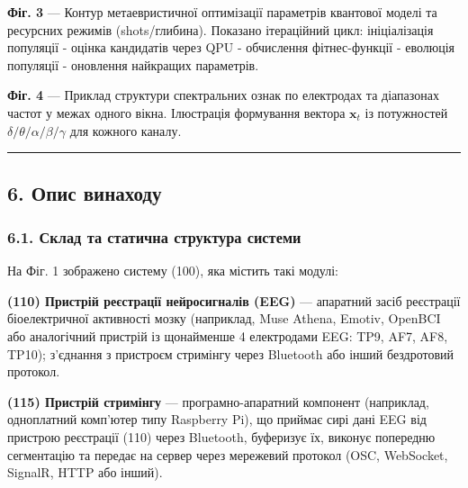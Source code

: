 \documentclass[12pt,a4paper]{article}
\begin{document}
\textbf{Фіг. 3} --- Контур метаевристичної оптимізації параметрів квантової моделі та ресурсних режимів (shots/глибина). Показано ітераційний цикл: ініціалізація популяції - оцінка кандидатів через QPU - обчислення фітнес-функції - еволюція популяції - оновлення найкращих параметрів.



\textbf{Фіг. 4} --- Приклад структури спектральних ознак по електродах та діапазонах частот у межах одного вікна. Ілюстрація формування вектора \(\mathbf{x}_t\) із потужностей \(\delta/\theta/\alpha/\beta/\gamma\) для кожного каналу.



\begin{center}\rule{0.5\linewidth}{0.5pt}\end{center}



\subsection{6. Опис винаходу}\label{ux43eux43fux438ux441-ux432ux438ux43dux430ux445ux43eux434ux443-1}



\subsubsection{6.1. Склад та статична структура системи}\label{ux441ux43aux43bux430ux434-ux442ux430-ux441ux442ux430ux442ux438ux447ux43dux430-ux441ux442ux440ux443ux43aux442ux443ux440ux430-ux441ux438ux441ux442ux435ux43cux438}



На Фіг. 1 зображено систему (100), яка містить такі модулі:



\textbf{(110) Пристрій реєстрації нейросигналів (EEG)} --- апаратний засіб реєстрації біоелектричної активності мозку (наприклад, Muse Athena, Emotiv, OpenBCI або аналогічний пристрій із щонайменше 4 електродами EEG: TP9, AF7, AF8, TP10); з'єднання з пристроєм стримінгу через Bluetooth або інший бездротовий протокол.



\textbf{(115) Пристрій стримінгу} --- програмно-апаратний компонент (наприклад, одноплатний комп'ютер типу Raspberry Pi), що приймає сирі дані EEG від пристрою реєстрації (110) через Bluetooth, буферизує їх, виконує попередню сегментацію та передає на сервер через мережевий протокол (OSC, WebSocket, SignalR, HTTP або інший).
\end{document}
